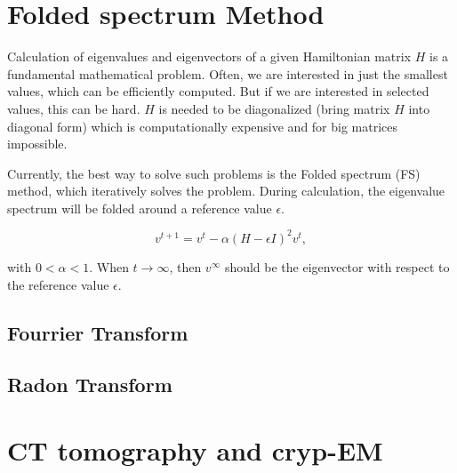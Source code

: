 \section{Folded spectrum Method}
\label{sec:FoldedSpectrumMethod}
Calculation of eigenvalues and eigenvectors of a given Hamiltonian matrix $H$ 
is a fundamental mathematical problem. Often, we are interested in just the smallest 
values, which can be efficiently computed. But if we are interested in selected values,
this can be hard. $H$ is needed to be diagonalized (bring matrix $H$ into diagonal form) 
which is computationally expensive and for big matrices impossible.

Currently, the best way to solve such problems is the Folded spectrum (FS) \cite{foldedSpectrumMethod} method,
which iteratively solves the problem. During calculation, the eigenvalue spectrum will be folded around a reference 
value $\epsilon$.

\begin{equation}
    v^{t+1} = v^t - \alpha (H - \epsilon I )^2 v^t ,
\end{equation}

with $0 < \alpha < 1$. When $t \rightarrow \infty$, then $v^{\infty}$ should be the 
eigenvector with respect to the reference value $\epsilon$.

\subsection{Fourrier Transform}
\subsection{Radon Transform}

\section{CT tomography and cryp-EM}